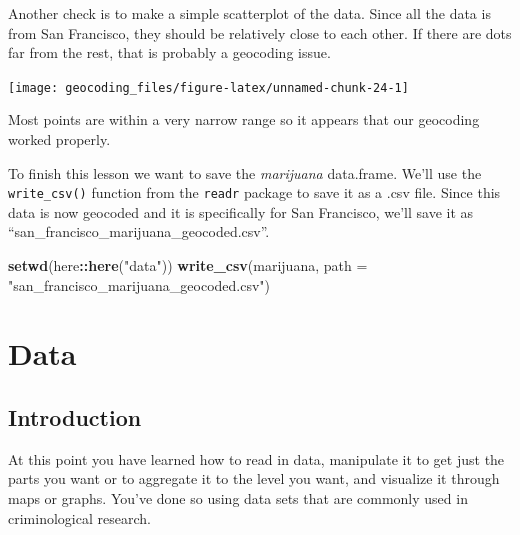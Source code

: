 \documentclass[
  12pt,
]{book}
\newenvironment{Shaded}{\begin{snugshade}}{\end{snugshade}}
\newcommand{\DataTypeTok}[1]{\textcolor[rgb]{0.13,0.29,0.53}{#1}}
\newcommand{\KeywordTok}[1]{\textcolor[rgb]{0.13,0.29,0.53}{\textbf{#1}}}
\newcommand{\NormalTok}[1]{#1}
\newcommand{\OperatorTok}[1]{\textcolor[rgb]{0.81,0.36,0.00}{\textbf{#1}}}
\newcommand{\StringTok}[1]{\textcolor[rgb]{0.31,0.60,0.02}{#1}}
\begin{document}
Another check is to make a simple scatterplot of the data. Since all the data is from San Francisco, they should be relatively close to each other. If there are dots far from the rest, that is probably a geocoding issue.

\begin{Shaded}
\end{Shaded}

\begin{center}\texttt{[image: geocoding\_files/figure-latex/unnamed-chunk-24-1]} \end{center}

Most points are within a very narrow range so it appears that our geocoding worked properly.

To finish this lesson we want to save the \emph{marijuana} data.frame. We'll use the \texttt{write\_csv()} function from the \texttt{readr} package to save it as a .csv file. Since this data is now geocoded and it is specifically for San Francisco, we'll save it as ``san\_francisco\_marijuana\_geocoded.csv''.

\begin{Shaded}
\begin{Highlighting}[]
\KeywordTok{setwd}\NormalTok{(here}\OperatorTok{::}\KeywordTok{here}\NormalTok{(}\StringTok{"data"}\NormalTok{))}
\KeywordTok{write\_csv}\NormalTok{(marijuana, }\DataTypeTok{path =} \StringTok{"san\_francisco\_marijuana\_geocoded.csv"}\NormalTok{)}
\end{Highlighting}
\end{Shaded}

\hypertarget{part-data}{%
\part{Data}\label{part-data}}

\hypertarget{introduction}{%
\chapter{Introduction}\label{introduction}}

At this point you have learned how to read in data, manipulate it to get just the parts you want or to aggregate it to the level you want, and visualize it through maps or graphs. You've done so using data sets that are commonly used in criminological research.
\end{document}
